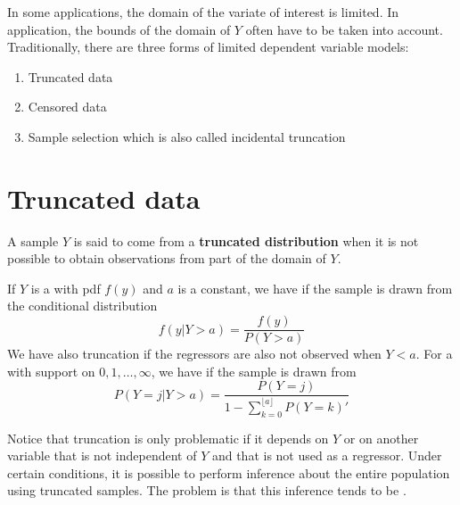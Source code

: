 \ChapterHeading

In some applications, the domain of the variate of interest is limited.
In application, the bounds of the domain of $Y$ often have to be taken into account.
Traditionally, there are three forms of limited dependent variable models:
\begin{enumerate}
    \item Truncated data
    \item Censored data
    \item Sample selection which is also called incidental truncation
\end{enumerate}

\section{Truncated data}

\begin{definition}
    A sample $Y$ is said to come from a \textbf{truncated distribution} when it is not possible to obtain observations from part of the domain of $Y$.
\end{definition}

If $Y$ is a  with pdf $f(y)$ and $a$ is a constant, we have  if the sample is drawn from the conditional distribution 
\begin{equation*}
    f(y|Y>a) = \frac{f(y)}{P(Y>a)}
\end{equation*}
We have also truncation if the regressors are also not observed when $Y<a$.
For a  with support on $0,1,\ldots,\infty$, we have  if the sample is drawn from 
\begin{equation*}
    P(Y=j|Y>a) = \frac{P(Y=j)}{1-\sum_{k=0}^{\lfloor a \rfloor}P(Y=k)'}
\end{equation*}

Notice that truncation is only problematic if it depends on $Y$ or on another variable that is not independent of $Y$ and that is not used as a regressor.
Under certain conditions, it is possible to perform inference about the entire population using truncated samples.
The problem is that this inference tends to be .

